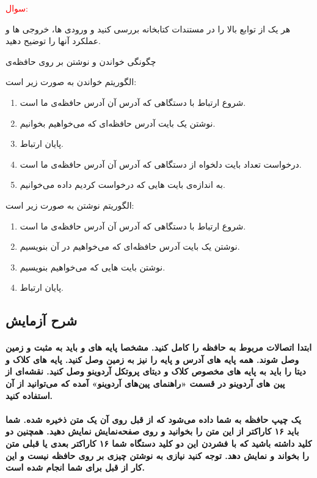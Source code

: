 \textcolor{red}{\begin{nas}سوال: \end{nas}}
هر یک از توابع بالا را در مستندات کتابخانه بررسی کنید و ورودی ها، خروجی ها و عملکرد آنها را توضیح دهید.
\pagebreak
\newline

\begin{nas}چگونگی خواندن و نوشتن بر روی حافظه‌ی \end{nas}
\newline
الگوریتم خواندن به صورت زیر است:
\begin{enumerate}
    \item شروع ارتباط با دستگاهی که آدرس  آن آدرس حافظه‌ی ما است.
    \item نوشتن یک بایت آدرس حافظه‌ای که می‌خواهیم بخوانیم.
    \item پایان ارتباط.
    \item درخواست تعداد بایت دلخواه از دستگاهی که آدرس  آن آدرس حافظه‌ی ما است.
    \item به اندازه‌ی بایت هایی که درخواست کردیم داده می‌خوانیم.
\end{enumerate}

الگوریتم نوشتن به صورت زیر است:
\begin{enumerate}
    \item شروع ارتباط با دستگاهی که آدرس  آن آدرس حافظه‌ی ما است.
    \item نوشتن یک بایت آدرس حافظه‌ای که می‌خواهیم در آن بنویسیم.
    \item نوشتن بایت هایی که می‌خواهیم بنویسیم.
    \item پایان ارتباط.
\end{enumerate}

\subsection{شرح آزمایش}

\paragraph{
ابتدا اتصالات مربوط به حافظه را کامل کنید. مشخصا پایه های  و  باید به مثبت و زمین وصل شوند. همه پایه های آدرس و پایه  را نیز به زمین وصل کنید. پایه های کلاک و دیتا را باید به پایه های مخصوص کلاک و دیتای پروتکل  آردوینو وصل کنید. نقشه‌ای از پین های آردوینو در قسمت «راهنمای پین‌های آردوینو» آمده که می‌توانید از آن استفاده کنید.
}

\paragraph{
یک چیپ حافظه به شما داده می‌شود که از قبل روی آن یک متن ذخیره شده. شما باید ۱۶ کاراکتر از این متن را بخوانید و روی صفحه‌نمایش نمایش دهید. همچنین دو کلید داشته باشید که با فشردن این دو کلید دستگاه شما ۱۶ کاراکتر بعدی یا قبلی متن را بخواند و نمایش دهد. 
توجه کنید نیازی به نوشتن چیزی بر روی حافظه نیست و این کار از قبل برای شما انجام شده است.
}